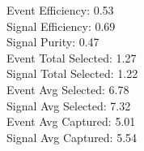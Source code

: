 Event  Efficiency:     0.53\\
Signal Efficiency:     0.69\\
Signal Purity:         0.47\\
Event  Total Selected: 1.27\\
Signal Total Selected: 1.22\\
Event  Avg Selected:   6.78\\
Signal Avg Selected:   7.32\\
Event  Avg Captured:   5.01\\
Signal Avg Captured:   5.54
